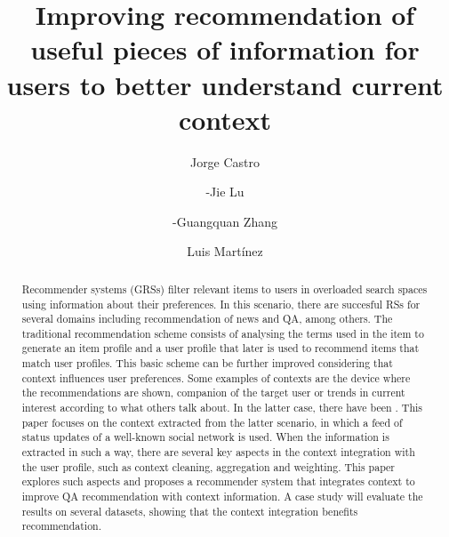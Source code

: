 \documentclass[preprint]{elsarticle}
\begin{document}
\title{Improving recommendation of useful pieces of information for users to better understand current context}

\begin{spacing}{1.5}

\begin{frontmatter}

\author[addressjorge,addressjie]{Jorge Castro}

\author[addressjie]{-Jie Lu}

\author[addressjie]{-Guangquan Zhang}

\author[addressluis]{Luis Mart\'inez}

\address[addressjorge]{Department of Computer Science and Artificial Intelligence, University of Granada, Granada (Spain)}
\address[addressjie]{School of Software, University of Technology Sydney, Sydney (Australia)}
\address[addressluis]{Computer Science Department, University of Ja\'en, Ja\'en (Spain)}

\begin{abstract}

Recommender systems (GRSs) filter relevant items to users in overloaded search spaces using information about their preferences. In this scenario, there are succesful RSs for several domains including recommendation of news and QA, among others. The traditional recommendation scheme consists of analysing the terms used in the item to generate an item profile and a user profile that later is used to recommend items that match user profiles. This basic scheme can be further improved considering that context influences user preferences. Some examples of contexts are the device where the recommendations are shown, companion of the target user or trends in current interest according to what others talk about. In the latter case, there have been . This paper focuses on the context extracted from the latter scenario, in which a feed of status updates of a well-known social network is used. When the information is extracted in such a way, there are several key aspects in the context integration with the user profile, such as context cleaning, aggregation and weighting. This paper explores such aspects and proposes a recommender system that integrates context to improve QA recommendation with context information. A case study will evaluate the results on several datasets, showing that the context integration benefits recommendation.


\end{abstract}
\end{frontmatter}
\end{spacing}
\end{document}
